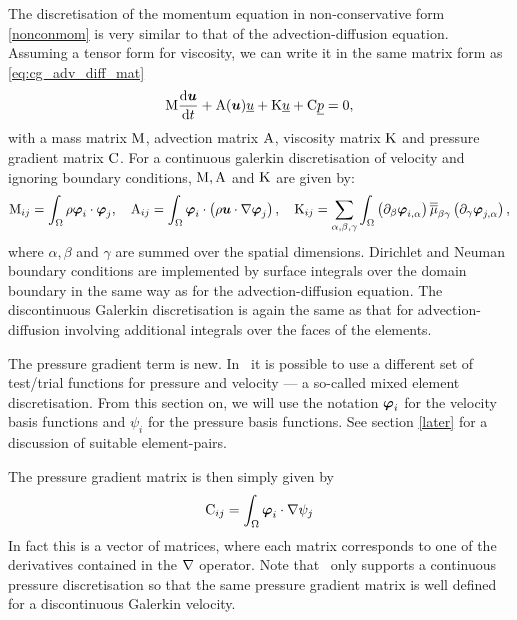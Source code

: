 \label{Sect:ND_momentum_equation}
The discretisation of the momentum equation in non-conservative
form \eqref{nonconmom} is very similar to that of the advection-diffusion 
equation. Assuming a tensor form for viscosity, we
can write it in the same matrix form as
\eqref{eq:cg_adv_diff_mat}
\begin{equation}\label{eq:momentum_equation}
  \mathrm{M} \frac{\mathrm{d}{\mbox{\boldmath$u$}}}{\mathrm{d} t}
    +\mathrm{A}({\mbox{\boldmath$u$}})\underline{u}+\mathrm{K}\underline{ u}
    +\mathrm{C} \underline{p}
    =0,
\end{equation}
with a mass matrix $\mathrm{M}$, advection matrix $\mathrm{A}$,
viscosity matrix $\mathrm{K}$ and pressure gradient matrix $\mathrm{C}$.
For a continuous galerkin discretisation of
velocity and ignoring boundary conditions, $\mathrm{M}, \mathrm{A}$ and $\mathrm{K}$
are given by:
\begin{equation}
  \mathrm{M}_{ij}=\int_\Omega \rho{\mbox{\boldmath$\varphi$}}_i\cdot{\mbox{\boldmath$\varphi$}}_j, \quad
  \mathrm{A}_{ij}=\int_\Omega {\mbox{\boldmath$\varphi$}}_i\cdot\left(\rho{\mbox{\boldmath$u$}}\cdot\nabla {\mbox{\boldmath$\varphi$}}_j\right), \quad
  \mathrm{K}_{ij}=\sum_{\alpha,\beta,\gamma} \int_\Omega
    \left(\partial_\beta{\mbox{\boldmath$\varphi$}}_{i,\alpha}\right) \overline{\overline{\mu}}_{\beta\gamma}
      \left(\partial_\gamma {\mbox{\boldmath$\varphi$}}_{j,\alpha}\right),
\end{equation}
where $\alpha,\beta$ and $\gamma$ are summed over the spatial dimensions.
Dirichlet and Neuman boundary conditions are implemented by
surface integrals over the domain boundary in the same way
as for the advection-diffusion equation. The discontinuous Galerkin
discretisation is again the same as that for advection-diffusion
involving additional integrals over the faces of the elements.

The pressure gradient term is new. In \fluidity\ it is possible
to use a different set of test/trial functions for pressure
and velocity --- a so-called mixed element discretisation. From this section
on, we will use the notation ${\mbox{\boldmath$\varphi$}}_i$ for the velocity
basis functions and $\psi_i$ for the pressure basis functions.
See section \ref{later} for a discussion of suitable element-pairs.

The pressure gradient matrix is then simply given by
\begin{equation}
  \mathrm{C}_{ij}=\int_\Omega {\mbox{\boldmath$\varphi$}}_i\cdot\nabla\psi_j \label{pgmatrix}
\end{equation}
In fact this is a vector of matrices, where each matrix corresponds
to one of the derivatives contained in the $\nabla$ operator. Note that \fluidity\ only supports
a continuous pressure discretisation so that the same
pressure gradient matrix is well defined for a discontinuous Galerkin
velocity.

